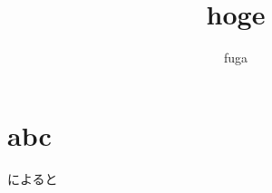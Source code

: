 \documentclass[11pt]{jsarticle}
\title{hoge}
\author{fuga}
\begin{document}
\maketitle

\section{abc}
\citet{rosenbaum1983central}によると




\end{document}

